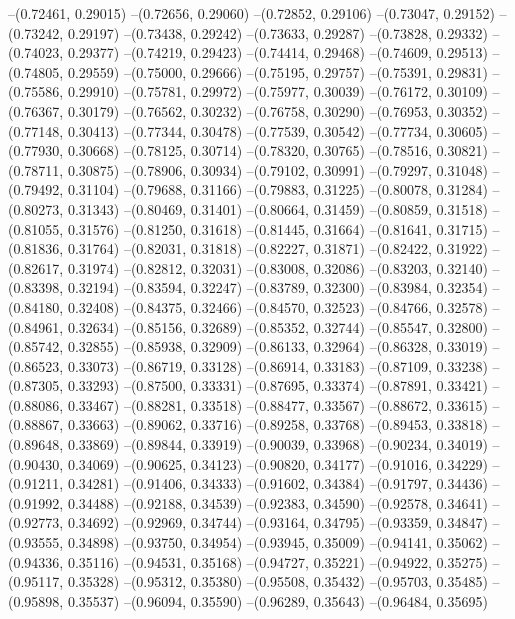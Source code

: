 --(0.72461, 0.29015)
--(0.72656, 0.29060)
--(0.72852, 0.29106)
--(0.73047, 0.29152)
--(0.73242, 0.29197)
--(0.73438, 0.29242)
--(0.73633, 0.29287)
--(0.73828, 0.29332)
--(0.74023, 0.29377)
--(0.74219, 0.29423)
--(0.74414, 0.29468)
--(0.74609, 0.29513)
--(0.74805, 0.29559)
--(0.75000, 0.29666)
--(0.75195, 0.29757)
--(0.75391, 0.29831)
--(0.75586, 0.29910)
--(0.75781, 0.29972)
--(0.75977, 0.30039)
--(0.76172, 0.30109)
--(0.76367, 0.30179)
--(0.76562, 0.30232)
--(0.76758, 0.30290)
--(0.76953, 0.30352)
--(0.77148, 0.30413)
--(0.77344, 0.30478)
--(0.77539, 0.30542)
--(0.77734, 0.30605)
--(0.77930, 0.30668)
--(0.78125, 0.30714)
--(0.78320, 0.30765)
--(0.78516, 0.30821)
--(0.78711, 0.30875)
--(0.78906, 0.30934)
--(0.79102, 0.30991)
--(0.79297, 0.31048)
--(0.79492, 0.31104)
--(0.79688, 0.31166)
--(0.79883, 0.31225)
--(0.80078, 0.31284)
--(0.80273, 0.31343)
--(0.80469, 0.31401)
--(0.80664, 0.31459)
--(0.80859, 0.31518)
--(0.81055, 0.31576)
--(0.81250, 0.31618)
--(0.81445, 0.31664)
--(0.81641, 0.31715)
--(0.81836, 0.31764)
--(0.82031, 0.31818)
--(0.82227, 0.31871)
--(0.82422, 0.31922)
--(0.82617, 0.31974)
--(0.82812, 0.32031)
--(0.83008, 0.32086)
--(0.83203, 0.32140)
--(0.83398, 0.32194)
--(0.83594, 0.32247)
--(0.83789, 0.32300)
--(0.83984, 0.32354)
--(0.84180, 0.32408)
--(0.84375, 0.32466)
--(0.84570, 0.32523)
--(0.84766, 0.32578)
--(0.84961, 0.32634)
--(0.85156, 0.32689)
--(0.85352, 0.32744)
--(0.85547, 0.32800)
--(0.85742, 0.32855)
--(0.85938, 0.32909)
--(0.86133, 0.32964)
--(0.86328, 0.33019)
--(0.86523, 0.33073)
--(0.86719, 0.33128)
--(0.86914, 0.33183)
--(0.87109, 0.33238)
--(0.87305, 0.33293)
--(0.87500, 0.33331)
--(0.87695, 0.33374)
--(0.87891, 0.33421)
--(0.88086, 0.33467)
--(0.88281, 0.33518)
--(0.88477, 0.33567)
--(0.88672, 0.33615)
--(0.88867, 0.33663)
--(0.89062, 0.33716)
--(0.89258, 0.33768)
--(0.89453, 0.33818)
--(0.89648, 0.33869)
--(0.89844, 0.33919)
--(0.90039, 0.33968)
--(0.90234, 0.34019)
--(0.90430, 0.34069)
--(0.90625, 0.34123)
--(0.90820, 0.34177)
--(0.91016, 0.34229)
--(0.91211, 0.34281)
--(0.91406, 0.34333)
--(0.91602, 0.34384)
--(0.91797, 0.34436)
--(0.91992, 0.34488)
--(0.92188, 0.34539)
--(0.92383, 0.34590)
--(0.92578, 0.34641)
--(0.92773, 0.34692)
--(0.92969, 0.34744)
--(0.93164, 0.34795)
--(0.93359, 0.34847)
--(0.93555, 0.34898)
--(0.93750, 0.34954)
--(0.93945, 0.35009)
--(0.94141, 0.35062)
--(0.94336, 0.35116)
--(0.94531, 0.35168)
--(0.94727, 0.35221)
--(0.94922, 0.35275)
--(0.95117, 0.35328)
--(0.95312, 0.35380)
--(0.95508, 0.35432)
--(0.95703, 0.35485)
--(0.95898, 0.35537)
--(0.96094, 0.35590)
--(0.96289, 0.35643)
--(0.96484, 0.35695)
